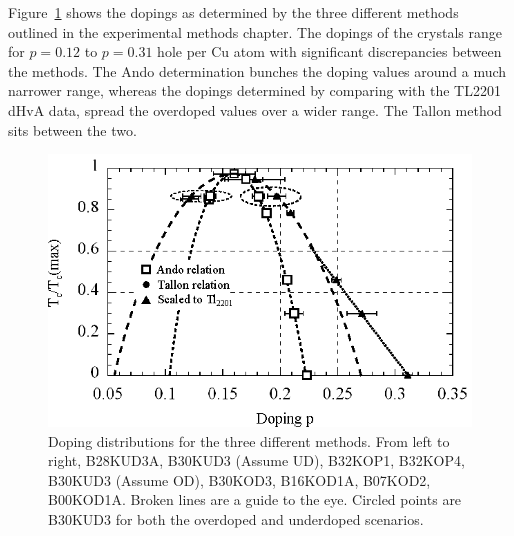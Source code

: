 Figure~\ref{Fig:ResH:Dopings} shows the dopings as determined by the three different methods outlined in the experimental methods chapter. The dopings of the crystals range for $p=0.12$ to $p=0.31$ hole per Cu atom with significant discrepancies between the methods. The Ando determination bunches the doping values around a much narrower range, whereas the dopings determined by comparing with the \ac{TL2201} \ac{dHvA} data, spread the overdoped values over a wider range. The Tallon method sits between the two.

\begin{figure}[htbp]
    \begin{center}
        \includegraphics[scale=1.1]{Chapter-HallBSCO/Figures/Dopings/Dopings}
        \caption{Doping distributions for the three different methods. From left to right, B28KUD3A, B30KUD3 (Assume UD), B32KOP1, B32KOP4, B30KUD3 (Assume OD), B30KOD3, B16KOD1A, B07KOD2, B00KOD1A. Broken lines are a guide to the eye. Circled points are B30KUD3 for both the overdoped and underdoped scenarios.}
        \label{Fig:ResH:Dopings}
    \end{center}
\end{figure}

